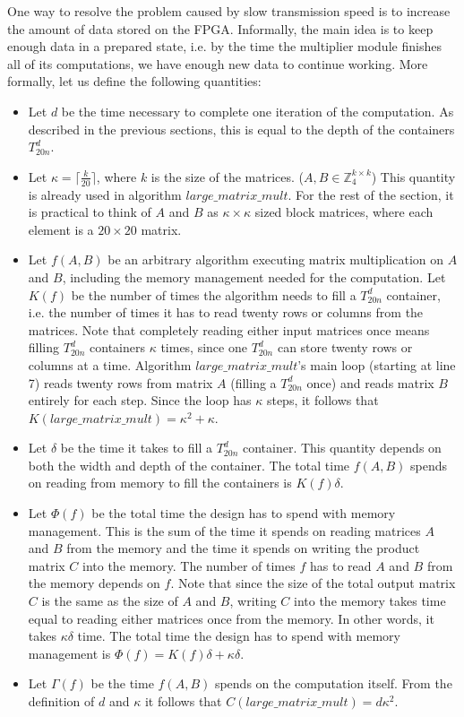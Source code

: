 \documentclass[11pt,twoside]{article}
\begin{document}
One way to resolve the problem caused by slow transmission speed is to increase the amount of data stored on the FPGA. Informally, the main idea is to keep enough data in a prepared state, i.e. by the time the multiplier module finishes all of its computations, we have enough new data to continue working. More formally, let us define the following quantities:
\begin{itemize}
\item Let $d$ be the time necessary to complete one iteration of the computation. As described in the previous sections, this is equal to the depth of the containers $T_{20n}^{d}$.
\item Let $\kappa=\lceil \frac{k}{20} \rceil$, where $k$ is the size of the matrices. ($A,B \in \mathbb{Z}_4^{k \times k}$) This quantity is already used in algorithm $large\_matrix\_mult$. For the rest of the section, it is practical to think of $A$ and $B$ as $\kappa \times \kappa$ sized block matrices, where each element is a $20 \times 20$ matrix.
\item Let $f(A,B)$ be an arbitrary algorithm executing matrix multiplication on $A$ and $B$, including the memory management needed for the computation. Let $K(f)$ be the number of times the algorithm needs to fill a $T_{20n}^{d}$ container, i.e. the number of times it has to read twenty rows or columns from the matrices. Note that completely reading either input matrices once means filling $T_{20n}^{d}$ containers $\kappa$ times, since one $T_{20n}^{d}$ can store twenty rows or columns at a time. Algorithm $large\_matrix\_mult$'s main loop (starting at line 7) reads twenty rows from matrix $A$ (filling a $T_{20n}^{d}$ once) and reads matrix $B$ entirely for each step. Since the loop has $\kappa$ steps, it follows that $K(large\_matrix\_mult)=\kappa^2+\kappa$.
\item Let $\delta$ be the time it takes to fill a $T_{20n}^{d}$ container. This quantity depends on both the width and depth of the container. The total time $f(A,B)$ spends on reading from memory to fill the containers is $K(f)\delta$.
\item Let $\Phi(f)$ be the total time the design has to spend with memory management. This is the sum of the time it spends on reading matrices $A$ and $B$ from the memory and the time it spends on writing the product matrix $C$ into the memory. The number of times $f$ has to read $A$ and $B$ from the memory depends on $f$. Note that since the size of the total output matrix $C$ is the same as the size of $A$ and $B$, writing $C$ into the memory takes time equal to reading either matrices once from the memory. In other words, it takes $\kappa\delta$ time. The total time the design has to spend with memory management is $\Phi(f)=K(f)\delta+\kappa\delta$.
\item Let $\Gamma(f)$ be the time $f(A,B)$ spends on the computation itself. From the definition of $d$ and $\kappa$ it follows that $C(large\_matrix\_mult)=d\kappa^2$.
\end{itemize}
\end{document}
